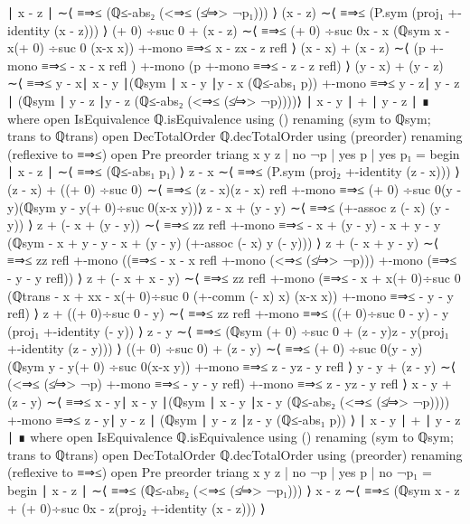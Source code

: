 \documentclass[11pt,a4paper]{article}
\begin{document}
\begin{code}
  ∣ x - z ∣   ∼⟨ ≡⇒≤ (ℚ≤-abs₂ (<⇒≤ (≰⇒> ¬p₁))) ⟩
  (x - z) ∼⟨   ≡⇒≤ (P.sym (proj₁ +-identity (x - z)))  ⟩
  (+ 0) ÷suc 0 + (x - z) ∼⟨  ≡⇒≤ {(+ 0) ÷suc 0}{x - x}
  (ℚsym {x - x}{(+ 0) ÷suc 0} (x-x {x})) +-mono ≡⇒≤ {x - z}{x - z} refl ⟩
  (x - x) + (x - z) ∼⟨  (p  +-mono ≡⇒≤ { - x}{ - x} refl ) +-mono
  (p +-mono ≡⇒≤ { - z}{ - z} refl) ⟩
  (y - x) + (y - z) ∼⟨  ≡⇒≤ {y - x}{∣ x - y ∣}(ℚsym {∣ x - y ∣}{y - x}
  (ℚ≤-abs₁ p)) +-mono ≡⇒≤ {y - z}{∣ y - z ∣} (ℚsym {∣ y - z ∣}{y - z}
  (ℚ≤-abs₂ (<⇒≤ (≰⇒> ¬p))))⟩ 
  ∣ x - y ∣ + ∣ y - z ∣ ∎ 
     where
     open IsEquivalence ℚ.isEquivalence using ()
       renaming (sym to ℚsym; trans to ℚtrans)
     open DecTotalOrder ℚ.decTotalOrder using (preorder)
       renaming (reflexive to ≡⇒≤)
     open Pre preorder
triang x y z | no ¬p | yes p | yes p₁ = begin
  ∣ x - z ∣                 ∼⟨ ≡⇒≤ (ℚ≤-abs₁ p₁)   ⟩
  z - x                    ∼⟨ ≡⇒≤ (P.sym (proj₂ +-identity (z - x))) ⟩
  (z - x) + ((+ 0) ÷suc 0) ∼⟨  ≡⇒≤ {(z - x)}{(z - x)} refl
  +-mono ≡⇒≤ {(+ 0) ÷suc 0}{(y - y)}(ℚsym {y - y}{(+ 0)÷suc 0}(x-x {y}))⟩
  z - x + (y - y)          ∼⟨ ≡⇒≤ (+-assoc z (- x) (y - y)) ⟩
  z + (- x + (y - y))      ∼⟨ ≡⇒≤ {z}{z} refl +-mono
  ≡⇒≤ { - x + (y - y)}{ - x + y - y}
  (ℚsym { - x + y - y}{ - x + (y - y)} (+-assoc (- x) y (- y))) ⟩
  z + (- x + y - y)        ∼⟨ ≡⇒≤ {z}{z} refl +-mono
  ((≡⇒≤ { - x}{ - x} refl  +-mono  (<⇒≤ (≰⇒> ¬p)))
  +-mono (≡⇒≤ { - y}{ - y} refl)) ⟩
  z + (- x + x - y)        ∼⟨ ≡⇒≤ {z}{z} refl +-mono
  (≡⇒≤ { - x + x}{(+ 0)÷suc 0} (ℚtrans { - x + x}{x - x}{(+ 0)÷suc 0}
  (+-comm (- x) x) (x-x {x})) +-mono ≡⇒≤ { - y}{ - y} refl) ⟩
  z + ((+ 0)÷suc 0 - y) ∼⟨ ≡⇒≤ {z}{z} refl +-mono
  ≡⇒≤ {((+ 0)÷suc 0 - y)}{ - y} (proj₁ +-identity (- y)) ⟩
  z - y ∼⟨ ≡⇒≤  (ℚsym {(+ 0) ÷suc 0 + (z - y)}{z - y}(proj₁ +-identity (z - y))) ⟩
  ((+ 0) ÷suc 0) + (z - y) ∼⟨ ≡⇒≤ {(+ 0) ÷suc 0}{(y - y)}
  (ℚsym {y - y}{(+ 0) ÷suc 0}(x-x {y})) +-mono ≡⇒≤ {z - y}{z - y} refl ⟩
  y - y + (z - y) ∼⟨ (<⇒≤ (≰⇒> ¬p) +-mono ≡⇒≤ { - y}{ - y} refl)
  +-mono ≡⇒≤ {z - y}{z - y} refl ⟩
  x - y + (z - y) ∼⟨ ≡⇒≤ {x - y}{∣ x - y ∣}(ℚsym {∣ x - y ∣}{x - y}
  (ℚ≤-abs₂ (<⇒≤ (≰⇒> ¬p)))) +-mono ≡⇒≤ {z - y}{∣ y - z ∣}
  (ℚsym {∣ y - z ∣}{z - y} (ℚ≤-abs₁ p)) ⟩
  ∣ x - y ∣ + ∣ y - z ∣ ∎ 
     where
     open IsEquivalence ℚ.isEquivalence using ()
       renaming (sym to ℚsym; trans to ℚtrans)
     open DecTotalOrder ℚ.decTotalOrder using (preorder)
       renaming (reflexive to ≡⇒≤)
     open Pre preorder
triang x y z | no ¬p | yes p | no ¬p₁ = begin
  ∣ x - z ∣   ∼⟨ ≡⇒≤ (ℚ≤-abs₂ (<⇒≤ (≰⇒> ¬p₁)))   ⟩
  x - z ∼⟨ ≡⇒≤ (ℚsym {x - z + (+ 0)÷suc 0}{x - z}(proj₂ +-identity (x - z))) ⟩

\end{code}
\end{document}
